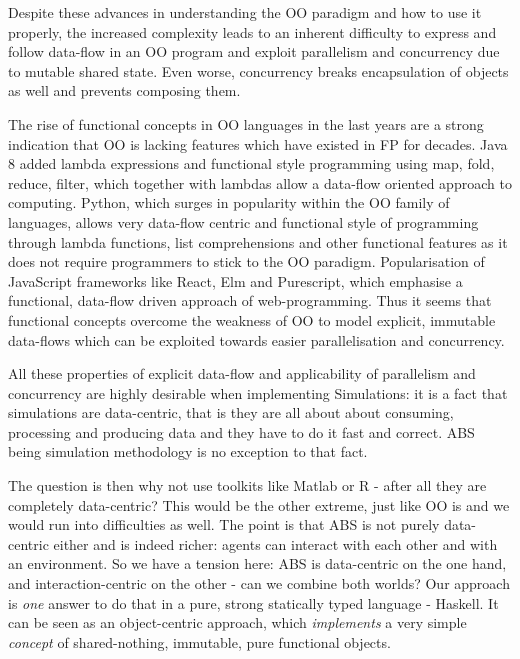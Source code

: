 Despite these advances in understanding the OO paradigm and how to use it properly, the increased complexity leads to an inherent difficulty to express and follow data-flow in an OO program and exploit parallelism and concurrency due to mutable shared state. Even worse, concurrency breaks encapsulation of objects as well and prevents composing them. 

The rise of functional concepts in OO languages in the last years are a strong indication that OO is lacking features which have existed in FP for decades. Java 8 added lambda expressions and functional style programming using map, fold, reduce, filter, which together with lambdas allow a data-flow oriented approach to computing. Python, which surges in popularity within the OO family of languages, allows very data-flow centric and functional style of programming through lambda functions, list comprehensions and other functional features as it does not require programmers to stick to the OO paradigm. Popularisation of JavaScript frameworks like React, Elm and Purescript, which emphasise a functional, data-flow driven approach of web-programming. Thus it seems that functional concepts overcome the weakness of OO to model explicit, immutable data-flows which can be exploited towards easier parallelisation and concurrency.

All these properties of explicit data-flow and applicability of parallelism and concurrency are highly desirable when implementing Simulations: it is a fact that simulations are data-centric, that is they are all about about consuming, processing and producing data and they have to do it fast and correct. ABS being simulation methodology is no exception to that fact.

The question is then why not use toolkits like Matlab or R - after all they are completely data-centric? This would be the other extreme, just like OO is and we would run into difficulties as well. The point is that ABS is not purely data-centric either and is indeed richer: agents can interact with each other and with an environment. So we have a tension here: ABS is data-centric on the one hand, and interaction-centric on the other - can we combine both worlds? Our approach is \textit{one} answer to do that in a pure, strong statically typed language - Haskell. It can be seen as an object-centric approach, which \textit{implements} a very simple \textit{concept} of shared-nothing, immutable, pure functional objects.
